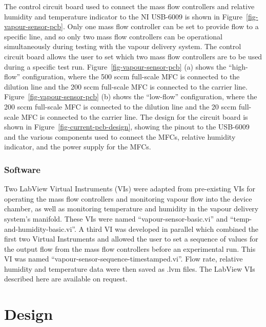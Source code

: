 \documentclass[
  a4paper,
]{scrbook}
\begin{document}
The control circuit board used to connect the mass flow controllers and
relative humidity and temperature indicator to the NI USB-6009 is shown
in Figure~\ref{fig-vapour-sensor-pcb}. Only one mass flow controller can
be set to provide flow to a specific line, and so only two mass flow
controllers can be operational simultaneously during testing with the
vapour delivery system. The control circuit board allows the user to set
which two mass flow controllers are to be used during a specific test
run. Figure~\ref{fig-vapour-sensor-pcb} (a) shows the ``high-flow''
configuration, where the 500 sccm full-scale MFC is connected to the
dilution line and the 200 sccm full-scale MFC is connected to the
carrier line. Figure~\ref{fig-vapour-sensor-pcb} (b) shows the
``low-flow'' configuration, where the 200 sccm full-scale MFC is
connected to the dilution line and the 20 sccm full-scale MFC is
connected to the carrier line. The design for the circuit board is shown
in Figure~\ref{fig-current-pcb-design}, showing the pinout to the
USB-6009 and the various components used to connect the MFCs, relative
humidity indicator, and the power supply for the MFCs.

\hypertarget{software}{%
\subsubsection*{Software}\label{software}}

Two LabView Virtual Instruments (VIs) were adapted from pre-existing VIs
for operating the mass flow controllers and monitoring vapour flow into
the device chamber, as well as monitoring temperature and humidity in
the vapour delivery system's manifold. These VIs were named
``vapour-sensor-basic.vi'' and ``temp-and-humidity-basic.vi''. A third
VI was developed in parallel which combined the first two Virtual
Instruments and allowed the user to set a sequence of values for the
output flow from the mass flow controllers before an experimental run.
This VI was named ``vapour-sensor-sequence-timestamped.vi''. Flow rate,
relative humidity and temperature data were then saved as .lvm files.
The LabView VIs described here are available on request.

\hypertarget{sec-vapour-system-design}{%
\section{Design}\label{sec-vapour-system-design}}
\end{document}
